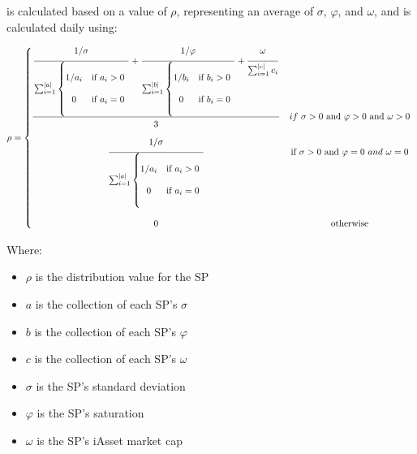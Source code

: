 \documentclass{article}
\begin{document}
\begin{sloppypar}
is calculated based on a value of \(\rho\), representing an average of
\(\sigma\), \(\varphi\), and \(\omega\), and is calculated daily using:

\[\rho = \left\{ \begin{matrix}
  \genfrac{}{}{}{}{\raisebox{5pt}{$\genfrac{}{}{}{}{\raisebox{7pt}{$1 / \sigma$}}{\raisebox{-7pt}{$\sum_{i = 1}^{\left| a \right|}\left\{ \begin{matrix}
    \\
    1 / a_{i} & \text{if\ }a_{i} > 0 \\ \\
    0 & \text{if\ }a_{i} = 0 \\ \\
    \end{matrix} \right.\ $}} + \genfrac{}{}{}{}{\raisebox{7pt}{$1 / \varphi$}}{\raisebox{-7pt}{$\sum_{i = 1}^{\left| b \right|}\left\{ \begin{matrix}
    \\
    1 / b_{i} & \text{if\ }b_{i} > 0 \\ \\
    0 & \text{if\ }b_{i} = 0 \\ \\
    \end{matrix} \right.\ $}} + \genfrac{}{}{}{}{\raisebox{7pt}{$\omega$}}{\raisebox{-7pt}{$\sum_{i = 1}^{\left| c \right|}c_{i}$}}$}}{\raisebox{-5pt}{$3$}} & if\ \sigma > 0\text{\ and\ }\varphi > 0\text{\ and\ }\omega > 0 \\
  & \\
  \genfrac{}{}{}{}{\raisebox{7pt}{$1 / \sigma$}}{\raisebox{-7pt}{$\sum_{i = 1}^{\left| a \right|}\left\{ \begin{matrix}
    \\
    1 / a_{i} & \text{if\ }a_{i} > 0 \\ \\
    0 & \text{if\ }a_{i} = 0 \\ \\
    \end{matrix} \right.\ $}} & \text{if\ }\sigma > 0\text{\ and\ }\varphi = 0\ and\ \omega = 0 \\
  & \\
  0 & \text{otherwise} \\
  \end{matrix} \right.\ \]

Where:

\begin{itemize}
\item
  \(\rho\) is the distribution value for the SP
\item
  \(a\) is the collection of each SP's \(\sigma\)
\item
  \(b\) is the collection of each SP's \(\varphi\)
\item
  \(c\) is the collection of each SP's \(\omega\)
\item
  \(\sigma\) is the SP's standard deviation
\item
  \(\varphi\) is the SP's saturation
\item
  \(\omega\) is the SP's iAsset market cap
\end{itemize}


\end{sloppypar}
\end{document}
